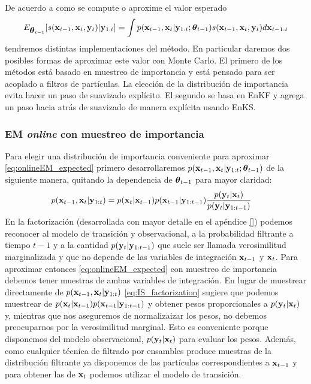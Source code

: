 De acuerdo a como se compute o aproxime el valor esperado
\begin{align}
    E_{\mbox{\boldmath$ \theta $}_{t-1}} [s(\mathbf{x}_{t-1}, \mathbf{x}_t, \mathbf{y}_t) | \mathbf{y}_{1:t}] = \int p(\mathbf{x}_{t-1}, \mathbf{x}_t| \mathbf{y}_{1:t} ; \mbox{\boldmath$ \theta $}_{t-1}) s(\mathbf{x}_{t-1}, \mathbf{x}_t, \mathbf{y}_t) d\mathbf{x}_{t-1:t} \label{eq:onlineEM_expected}
\end{align}
tendremos distintas implementaciones del método. En particular daremos dos posibles formas de aproximar este valor con Monte Carlo. El primero de los métodos está basado en muestreo de importancia y está pensado para ser acoplado a filtros de partículas. La elección de la distribución de importancia evita hacer un paso de suavizado explícito. El segundo se basa en EnKF y agrega un paso hacia atrás de suavizado de manera explícita usando EnKS. 

\subsubsection*{EM \textit{online} con muestreo de importancia} \label{sec:onlineEM_IS}

Para elegir una distribución de importancia conveniente para aproximar \ref{eq:onlineEM_expected} primero desarrollaremos $p(\mathbf{x}_{t-1}, \mathbf{x}_t| \mathbf{y}_{1:t}; \mbox{\boldmath$ \theta $}_{t-1})$ de la siguiente manera, quitando la dependencia de $\mbox{\boldmath$ \theta $}_{t-1}$ para mayor claridad:
\begin{align}
    p(\mathbf{x}_{t-1}, \mathbf{x}_t| \mathbf{y}_{1:t}) &= p(\mathbf{x}_t | \mathbf{x}_{t-1}) p(\mathbf{x}_{t-1} | \mathbf{y}_{1:t-1}) \frac{p(\mathbf{y}_t | \mathbf{x}_t)}{p(\mathbf{y}_t | \mathbf{y}_{1:t-1})} \label{eq:IS_factorization}
\end{align}
En la factorización (desarrollada con mayor detalle en el apéndice \ref{}) podemos reconocer al modelo de transición y observacional, a la probabilidad filtrante a tiempo $t-1$ y a la cantidad $p(\mathbf{y}_t | \mathbf{y}_{1:t-1})$ que suele ser llamada verosimilitud marginalizada y que no depende de las variables de integración $\mathbf{x}_{t-1}$ y $\mathbf{x}_t$. Para aproximar entonces \ref{eq:onlineEM_expected} con muestreo de importancia debemos tener muestras de ambas variables de integración. En lugar de muestrear directamente de $p(\mathbf{x}_{t-1}, \mathbf{x}_t| \mathbf{y}_{1:t})$ \ref{eq:IS_factorization} sugiere que podemos muestrear de $p(\mathbf{x}_t | \mathbf{x}_{t-1}) p(\mathbf{x}_{t-1} | \mathbf{y}_{1:t-1})$ y obtener pesos proporcionales a $p(\mathbf{y}_t | \mathbf{x}_t)$ y, mientras que nos aseguremos de normalizaizar los pesos, no debemos preocuparnos por la verosimilitud marginal. Esto es conveniente porque disponemos del modelo observacional, $p(\mathbf{y}_t | \mathbf{x}_t)$ para evaluar los pesos. Además, como cualquier técnica de filtrado por ensambles produce muestras de la distribución filtrante ya disponemos de las partículas correspondientes a $\mathbf{x}_{t-1}$ y para obtener las de $\mathbf{x}_t$ podemos utilizar el modelo de transición.

